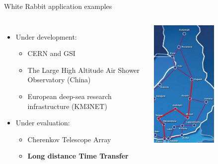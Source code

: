 \documentclass[compress, red]{beamer}
\begin{document}
\begin{frame}{White Rabbit application examples}
\begin{columns}[c]
    \begin{itemize}
      \item Under development:
      \begin{itemize}
	\item CERN and GSI
	\item The Large High Altitude Air Shower Observatory (China)
	\item European deep-sea research infrastructure (KM3NET) 
      \end{itemize}         	
      \item Under evaluation:
      \begin{itemize}
	\item Cherenkov Telescope Array
	\item \textbf{Long distance Time Transfer}
      \end{itemize}         	
    \end{itemize}    
    \begin{center}
      \includegraphics[width=0.6\textwidth]{applications/finland.jpg}
      \end{center}
\end{columns}
\end{frame}
\end{document}
